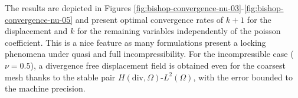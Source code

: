 \documentclass{wccm2024}
\begin{document}
The results are depicted in Figures \ref{fig:bishop-convergence-nu-03}-\ref{fig:bishop-convergence-nu-05} and present optimal convergence rates of $k+1$ for the displacement and $k$ for the remaining variables independently of the poisson coefficient. This is a nice feature as many formulations present a locking phenomena under quasi and full incompressibility. For the incompressible case ($\nu=0.5$), a divergence free displacement field is obtained even for the coarsest mesh thanks to the stable pair $H(\text{div},\Omega)$-$L^2(\Omega)$, with the error bounded to the machine precision.

\begin{figure} [!htb]
    \centering
     \hfill

\end{figure}
\end{document}

